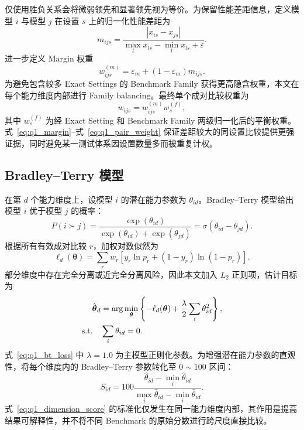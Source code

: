 仅使用胜负关系会将微弱领先和显著领先视为等价。为保留性能差距信息，定义模型 \(i\) 与模型 \(j\) 在设置 \(s\) 上的归一化性能差距为
\begin{equation}
m_{ijs}
=
\frac{|x_{is}-x_{js}|}
{\max_l x_{ls}-\min_l x_{ls}+\varepsilon}.
\label{eq:q1_margin}
\end{equation}
进一步定义 Margin 权重
\begin{equation}
w^{(m)}_{ijs}
=
\varepsilon_m+(1-\varepsilon_m)m_{ijs}.
\label{eq:q1_pair_weight_margin}
\end{equation}
为避免包含较多 Exact Settings 的 Benchmark Family 获得更高隐含权重，本文在每个能力维度内部进行 Family balancing。最终单个成对比较权重为
\begin{equation}
w_{ijs}
=
w^{(m)}_{ijs}w^{(f)}_s,
\label{eq:q1_pair_weight}
\end{equation}
其中 \(w^{(f)}_s\) 为经 Exact Setting 和 Benchmark Family 两级归一化后的平衡权重。式~\eqref{eq:q1_margin}--式~\eqref{eq:q1_pair_weight} 保证差距较大的同设置比较提供更强证据，同时避免某一测试体系因设置数量多而被重复计权。

\subsection{Bradley--Terry 模型}

在第 \(d\) 个能力维度上，设模型 \(i\) 的潜在能力参数为 \(\theta_{id}\)。Bradley--Terry 模型给出模型 \(i\) 优于模型 \(j\) 的概率：
\begin{equation}
P(i\succ j)
=
\frac{\exp(\theta_{id})}
{\exp(\theta_{id})+\exp(\theta_{jd})}
=
\sigma(\theta_{id}-\theta_{jd}).
\label{eq:q1_bt}
\end{equation}
根据所有有效成对比较 \(r\)，加权对数似然为
\begin{equation}
\ell_d(\boldsymbol{\theta})
=
\sum_r
w_r
\left[
y_r\ln p_r
+(1-y_r)\ln(1-p_r)
\right].
\label{eq:q1_bt_likelihood}
\end{equation}
部分维度中存在完全分离或近完全分离风险，因此本文加入 \(L_2\) 正则项，估计目标为
\begin{align}
\hat{\boldsymbol{\theta}}_d
&=
\arg\min_{\boldsymbol{\theta}}
\left\{
-\ell_d(\boldsymbol{\theta})
+\frac{\lambda}{2}\sum_i\theta_{id}^{2}
\right\}, \notag\\
\text{s.t.}\quad
&\sum_i\theta_{id}=0.
\label{eq:q1_bt_loss}
\end{align}
式~\eqref{eq:q1_bt_loss} 中 \(\lambda=1.0\) 为主模型正则化参数。为增强潜在能力参数的直观性，将每个维度内的 Bradley--Terry 参数转化至 \(0\sim100\) 区间：
\begin{equation}
S_{id}
=
100
\frac{
\hat{\theta}_{id}-\min_i\hat{\theta}_{id}
}{
\max_i\hat{\theta}_{id}-\min_i\hat{\theta}_{id}
}.
\label{eq:q1_dimension_score}
\end{equation}
式~\eqref{eq:q1_dimension_score} 的标准化仅发生在同一能力维度内部，其作用是提高结果可解释性，并不将不同 Benchmark 的原始分数进行跨尺度直接比较。

